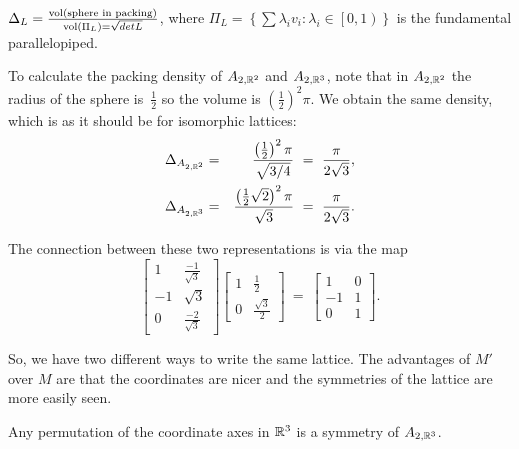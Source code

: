 \begin{definition}
  $\Delta_L=\frac{\operatorname{vol}(\text{sphere in packing})}{\operatorname{vol}(\Pi_L)=\sqrt{detL}}$,
  where $\Pi_L=\left\{\sum\lambda_i v_i : \lambda_i\in\left[0,1\right)\right\}$ is the
  fundamental parallelopiped.
\end{definition}

To calculate the packing density of $A_{2,\mathbb{R}^{2}}$ and $A_{2,\mathbb{R}^{3}}$, note that in
$A_{2,\mathbb{R}^{2}}$ the radius of the sphere is~$\frac{1}{2}$ so the volume is
$\left(\frac{1}{2}\right)^{2}\pi$. We obtain the same density, which is as it should be
for isomorphic lattices:
\begin{eqnarray*}
  \Delta_{A_{2,\mathbb{R}^{2}}}
 &=&
  \frac{\left(\frac{1}{2}\right)^{2}\pi}{\sqrt{3/4}}
  \ = \
  \frac{\pi}{2\sqrt{3}},
 \\
  \Delta_{A_{2,\mathbb{R}^{3}}}
 &=&
  \frac{\left(\frac{1}{2}\sqrt{2}\right)^{2}\pi}{\sqrt{3}}
  \ = \
  \frac{\pi}{2\sqrt{3}}.
\end{eqnarray*}

The connection between these two representations is via the map
\[
 \begin{bmatrix}
1 & \frac{-1}{\sqrt{3}} \\
-1 & \sqrt{3} \\
0 & \frac{-2}{\sqrt{3}}\end{bmatrix}
\begin{bmatrix}
1 & \frac{1}{2} \\
0 & \frac{\sqrt{3}}{2}
\end{bmatrix}
\ = \
\begin{bmatrix}
1 & 0 \\
-1 & 1 \\
0 & 1\end{bmatrix}.
\]

So, we have two different ways to write the same lattice. The advantages of $M'$ over $M$
are that the coordinates are nicer and the symmetries of the lattice are more easily seen.


\begin{claim}
Any permutation of the coordinate axes in $\mathbb{R}^{3}$ is a symmetry of $A_{2,\mathbb{R}^{3}}$.
\end{claim}



